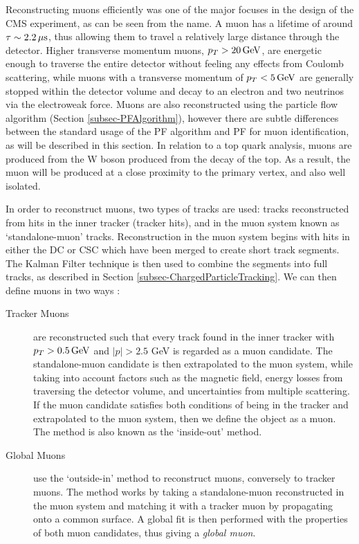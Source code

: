 Reconstructing muons efficiently was one of the major focuses in the design of the CMS experiment, as can be seen from the name. A muon has a lifetime of around $\tau \sim 2.2 \,\mu\text{s}$, thus allowing them to travel a relatively large distance through the detector. Higher transverse momentum muons, $p_T > 20 \,\text{Ge\hspace{-.08em}V}$, are energetic enough to traverse the entire detector without feeling any effects from Coulomb scattering, while muons with a transverse momentum of $p_T < 5 \,\text{Ge\hspace{-.08em}V}$ are generally stopped within the detector volume and decay to an electron and two neutrinos via the electroweak force. Muons are also reconstructed using the particle flow algorithm (Section \ref{subsec-PFAlgorithm}), however there are subtle differences between the standard usage of the PF algorithm and PF for muon identification, as will be described in this section. In relation to a top quark analysis, muons are produced from the W boson produced from the decay of the top. As a result, the muon will be produced at a close proximity to the primary vertex, and also well isolated. 

In order to reconstruct muons, two types of tracks are used: tracks reconstructed from hits in the inner tracker (tracker hits), and in the muon system known as `standalone-muon' tracks. Reconstruction in the muon system begins with hits in either the DC or CSC which have been merged to create short track segments. The Kalman Filter technique is then used to combine the segments into full tracks, as described in Section \ref{subsec-ChargedParticleTracking}. We can then define muons in two ways \cite{1748-0221-7-10-P10002}: 

\begin{description}
	\item[Tracker Muons] are reconstructed such that every track found in the inner tracker with $p_T > 0.5 \,\text{Ge\hspace{-.08em}V}$ and $|p| > 2.5$ GeV is regarded as a muon candidate. The standalone-muon candidate is then extrapolated to the muon system, while taking into account factors such as the magnetic field, energy losses from traversing the detector volume, and uncertainties from multiple scattering. If the muon candidate satisfies both conditions of being in the tracker and extrapolated to the muon system, then we define the object as a muon. The method is also known as the `inside-out' method.
	\item[Global Muons] use the `outside-in' method to reconstruct muons, conversely to tracker muons. The method works by taking a standalone-muon reconstructed in the muon system and matching it with a tracker muon by propagating onto a common surface. A global fit is then performed with the properties of both muon candidates, thus giving a \emph{global muon}. 
\end{description}

